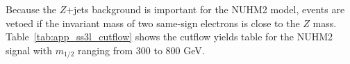 
Because the $Z$+jets background is important for the NUHM2 model, events are vetoed if the invariant mass of two same-sign electrons is close to the $Z$ mass.
Table~\ref{tab:app_ss3l_cutflow} shows the cutflow yields table for the NUHM2 signal with $m_{1/2}$ ranging from 300 to 800 GeV.

